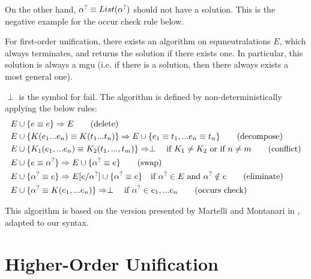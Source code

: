 \documentclass[twoside,12pt,a4paper]{article}
\begin{document}
On the other hand, $\alpha^?\equiv List(\alpha^?)$ should not have a solution. This is the negative example for the occur check rule below.


\begin{theorem}
    For first-order unification, there exists an algorithm on equneutralations $E$, which always terminates, and returns the solution if there exists one. 
    In particular, this solution is always a mgu (i.e. if there is a solution, then there always exists a most general one).
\end{theorem}

\begin{definition}
    $\perp$ is the symbol for fail.
    The algorithm is defined by non-deterministically applying the below rules:
    \begin{align*}
        E & \cup \{ e \equiv e\} \Rightarrow E \tag{delete}\\
        E & \cup \{K(e_1 ... e_n) \equiv K(t_1 ... t_n)\} \Rightarrow E \cup \{e_1 \equiv t_1, ... e_n \equiv t_n\}\tag{decompose}\\
        E & \cup \{K_1(e_1,...e_n) \equiv K_2(t_1, ..., t_m)\}  \Rightarrow \perp \quad\text{if $K_1 \neq K_2$ or if $n\neq m$} \tag{conflict}\\
        E & \cup \{e \equiv \alpha^?\} \Rightarrow E \cup \{\alpha^? \equiv e\}\tag{swap}\\ 
        E & \cup \{\alpha^? \equiv e\} \Rightarrow E[e/\alpha^?] \cup \{\alpha^? \equiv e\} \quad\text{if $\alpha^? \in E$ and $\alpha^? \notin e$}  \tag{eliminate}\\
        E & \cup \{\alpha^? \equiv K(e_1,...e_n)\}\Rightarrow \perp \quad \text{if $\alpha^? \in e_1,...e_n$} \tag{occurs check} 
    \end{align*}
\end{definition} 

This algorithm is based on the version presented by Martelli and Montanari in \cite{10.1145/357162.357169},
adapted to our syntax.

\section{Higher-Order Unification}
\end{document}
